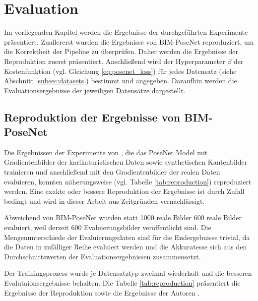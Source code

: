 
\section{Evaluation}
Im vorliegenden Kapitel werden die Ergebnisse der durchgeführten Experimente präsentiert. Zuallererst wurden die Ergebnisse von BIM-PoseNet \cite{acharyaBIMPoseNetIndoorCamera2019} reproduziert, um die Korrektheit der Pipeline zu überprüfen. Daher werden die Ergebnisse der Reproduktion zuerst präsentiert. Anschließend wird der Hyperparameter $\beta$ der Kostenfunktion (vgl. Gleichung \ref{eq:posenet_loss}) für jedes Datensatz (siehe Abschnitt \ref{subsec:datasets}) bestimmt und angegeben. Daraufhin werden die Evaluationsergebnisse der jeweiligen Datensätze dargestellt.
\subsection{Reproduktion der Ergebnisse von BIM-PoseNet}
Die Ergebnissen der Experimente von \citet{acharyaBIMPoseNetIndoorCamera2019}, die das PoseNet Model mit Gradientenbilder der karikaturistischen Daten sowie synthetischen Kantenbilder trainieren und anschließend mit den Gradientenbilder der realen Daten evaluieren, konnten näherungsweise (vgl. Tabelle \ref{tab:reproduction}) reproduziert werden. Eine exakte oder bessere Reproduktion der Ergebnisse ist durch Zufall bedingt und wird in dieser Arbeit aus Zeitgründen vernachlässigt.

Abweichend von BIM-PoseNet wurden statt 1000 reale Bilder 600 reale Bilder evaluiert, weil derzeit 600 Evaluierungsbilder veröffentlicht sind. Die Mengenunterschiede der Evaluierungsdaten sind für die Endergebnisse trivial, da die Daten in zufälliger Reihe evaluiert werden und die Akkuratesse sich aus den Durchschnittswerten der Evaluationsergebnissen zusammensetzt. 

Der Trainingsprozess wurde je Datensatztyp zweimal wiederholt und die besseren Evalutaionsergebnisse behalten. Die Tabelle \ref{tab:reproduction} präsentiert die Ergebnisse der Reproduktion sowie die Ergebnisse der Autoren \citet{acharyaBIMPoseNetIndoorCamera2019}.


